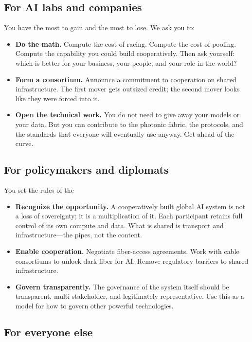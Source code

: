 \documentclass[12pt]{article}
\begin{document}
\subsection{For AI labs and companies}

You have the most to gain and the most to lose. We ask you to:
\begin{itemize}[leftmargin=1.6em,itemsep=2pt]
  \item \textbf{Do the math.} Compute the cost of racing. Compute the cost of
  pooling. Compute the capability you could build cooperatively. Then ask
  yourself: which is better for your business, your people, and your role in
  the world?
  \item \textbf{Form a consortium.} Announce a commitment to cooperation on
  shared infrastructure. The first mover gets outsized credit; the second mover
  looks like they were forced into it.
  \item \textbf{Open the technical work.} You do not need to give away your
  models or your data. But you can contribute to the photonic fabric, the
  protocols, and the standards that everyone will eventually use anyway. Get
  ahead of the curve.
\end{itemize}

\subsection{For policymakers and diplomats}

You set the rules of the
\begin{itemize}[leftmargin=1.6em,itemsep=2pt] \item \textbf{Recognize the opportunity.} A cooperatively built global AI system is not a loss of sovereignty; it is a multiplication of it. Each participant retains full control of its own compute and data. What is shared is transport and infrastructure---the pipes, not the content. \item \textbf{Enable cooperation.} Negotiate fiber-access agreements. Work with cable consortiums to unlock dark fiber for AI. Remove regulatory barriers to shared infrastructure. \item \textbf{Govern transparently.} The governance of the system itself should be transparent, multi-stakeholder, and legitimately representative. Use this as a model for how to govern other powerful technologies. \end{itemize}
\subsection{For everyone else}
\end{document}
